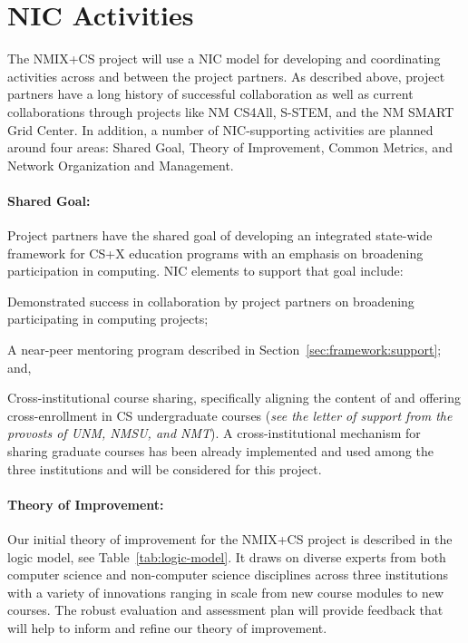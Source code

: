 \section{NIC Activities}
\label{sec:nic}
The NMIX+CS project will use a NIC model for developing and coordinating activities across and between the project partners. As described above, project partners have a long history of successful collaboration as well as current collaborations through projects like NM CS4All, S-STEM, and the NM SMART Grid Center. In addition, a number of NIC-supporting activities are planned around four areas: Shared Goal, Theory of Improvement, Common Metrics, and Network Organization and Management.

\paragraph{Shared Goal:} Project partners have the shared goal of developing an integrated state-wide framework for CS+X education programs with an emphasis on broadening participation in computing. NIC elements to support that goal include:
\begin{tightitemize}
        \item Demonstrated success in collaboration by project partners on broadening participating in computing projects;
        \item A near-peer mentoring program described in Section~\ref{sec:framework:support}; and,
        \item Cross-institutional course sharing, specifically aligning the content of and offering cross-enrollment in CS undergraduate courses (\textit{see the letter of support from the provosts of UNM, NMSU, and NMT}). %
        A cross-institutional mechanism for sharing graduate courses has been already implemented and used among the three institutions and will be considered for this project.
\end{tightitemize}

\paragraph{Theory of Improvement:} Our initial theory of improvement for the NMIX+CS project is described in the logic model, see Table~\ref{tab:logic-model}. It draws on diverse experts from both computer science and non-computer science disciplines across three institutions with a variety of innovations ranging in scale from new course modules to new courses. The robust evaluation and assessment plan will provide feedback that will help to inform and refine our theory of improvement.

